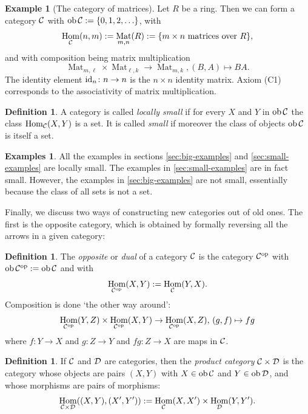 \documentclass[11pt]{amsbook}
\DeclareMathOperator\Hom{Hom}
\DeclareMathOperator\Mat{Mat}
\DeclareMathOperator\ob{ob}
\def\id{{\rm id}}
\def\opp{\mathrm{op}}
\theoremstyle{plain}
\theoremstyle{definition}
\newtheorem{definition}[theorem]{Definition}
\newtheorem{example}[theorem]{Example}
\newtheorem{examples}[theorem]{Examples}
\begin{document}
\begin{example}[The category of matrices] \label{exa:category-of-matrices}
Let $R$ be a ring. Then we can form a category ${\mathcal{C}}$  with $\ob \cC :=\{ 0, 1, 2, \ldots \}$,  with
\[
	\Hom_\cC(n,m) := \Mat_{m,n}(R) := \{ \text{$m\times n$ matrices over $R$} \},
\]
and with composition being matrix multiplication
\[
	 \Mat_{m,\ell} \times \Mat_{\ell,k}  \to \Mat_{m,k}, (B,A) \mapsto BA.
\]
The identity element $\id_n\colon n \to n$ is the $n\times n$ identity matrix. Axiom (C1) corresponds to the associativity of matrix multiplication.
\end{example}

\begin{definition}\label{def:small-category}
A category is called \emph{locally small} if for every $X$ and $Y$ in $\ob \cC$ the class $\Hom_{\cC}(X,Y)$ is a set. It is called \emph{small} if moreover the class of objects $\ob \cC$ is itself a set.
\end{definition}

\begin{examples}
All the examples in sections \ref{sec:big-examples} and \ref{sec:small-examples} are locally small. The examples in \ref{sec:small-examples} are in fact small. However, the examples in \ref{sec:big-examples} are not small, essentially because the class of all sets is not a set.
\end{examples}


Finally, we discuss two ways of constructing new categories out of old ones. The first is the opposite category, which is obtained by formally reversing all the arrows in a given category:
 
\begin{definition}\label{def:opposite-category}
The \emph{opposite} or \emph{dual} of a category ${\mathcal{C}}$ is the category $\cC^\opp$ with $\ob \cC^\opp := \ob\cC$ and with
\[
	\Hom_{\cC^\opp}(X,Y) := \Hom_\cC(Y,X).
\]
Composition is done `the other way around': 
\[
	\Hom_{\cC^\opp}(Y,Z) \times \Hom_{\cC^\opp}(X,Y)   \to \Hom_{\cC^\opp}(X,Z),\,
	(g,f) \mapsto fg
\]
where $f\colon Y \to X$ and $g\colon Z\to Y$ and $fg\colon Z \to X$ are maps in ${\mathcal{C}}$.
\end{definition}

\begin{definition}\label{def:product-category}
If ${\mathcal{C}}$ and ${\mathcal{D}}$ are categories, then the \emph{product category}
${\mathcal{C}}\times {\mathcal{D}}$ is the category whose objects are pairs $(X,Y)$ with $X\in \ob \cC$ and $Y\in \ob \cD$, and whose morphisms are pairs of morphisms:
\[
	\Hom_{\cC\times \cD}((X,Y),(X',Y')) := \Hom_\cC(X,X') \times \Hom_\cD(Y,Y').
\]
\end{definition}
\end{document}
